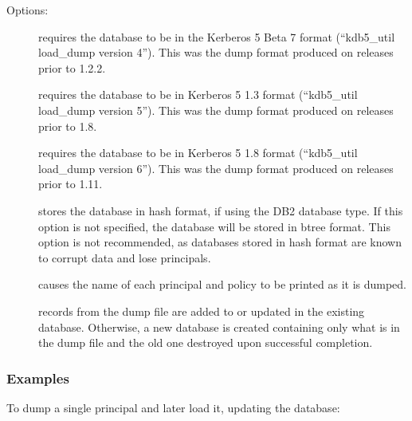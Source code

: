 \documentclass[letterpaper,10pt,english]{sphinxmanual}
\begin{document}
Options:
\begin{description}
\item[{}] \leavevmode
requires the database to be in the Kerberos 5 Beta 7 format
(“kdb5\_util load\_dump version 4”).  This was the dump format
produced on releases prior to 1.2.2.

\item[{}] \leavevmode
requires the database to be in Kerberos 5 1.3 format (“kdb5\_util
load\_dump version 5”).  This was the dump format produced on
releases prior to 1.8.

\item[{}] \leavevmode
requires the database to be in Kerberos 5 1.8 format (“kdb5\_util
load\_dump version 6”).  This was the dump format produced on
releases prior to 1.11.

\item[{}] \leavevmode
stores the database in hash format, if using the DB2 database
type.  If this option is not specified, the database will be
stored in btree format.  This option is not recommended, as
databases stored in hash format are known to corrupt data and lose
principals.

\item[{}] \leavevmode
causes the name of each principal and policy to be printed as it
is dumped.

\item[{}] \leavevmode
records from the dump file are added to or updated in the existing
database.  Otherwise, a new database is created containing only
what is in the dump file and the old one destroyed upon successful
completion.

\end{description}


\subsubsection{Examples}
\label{\detokenize{admin/database:id4}}
To dump a single principal and later load it, updating the database:

%
\begin{sphinxVerbatim}[commandchars=\\\{\}]
    

    
\end{sphinxVerbatim}
\end{document}
